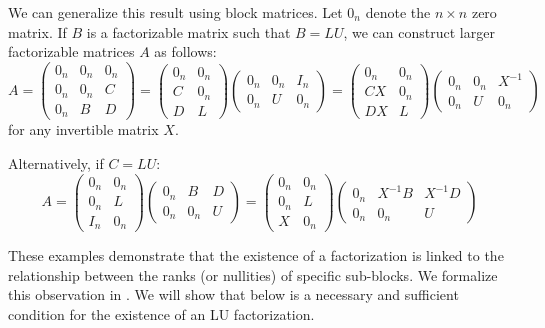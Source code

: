\documentclass[10pt,twoside]{siamart1116}
\numberwithin{theorem}{section}
\begin{document}
We can generalize this result using block matrices. Let $0_n$ denote the $n \times n$ zero matrix. If $B$ is a factorizable matrix such that $B=LU$, we can construct larger factorizable matrices $A$ as follows:
\[
	A = \begin{pmatrix}
		0_n & 0_n & 0_n \\
		0_n & 0_n & C   \\
		0_n & B   & D
	\end{pmatrix}
	=
	\begin{pmatrix}
		0_n & 0_n \\
		C   & 0_n \\
		D   & L
	\end{pmatrix}
	\begin{pmatrix}
		0_n & 0_n & I_n \\
		0_n & U   & 0_n
	\end{pmatrix}
	=
	\begin{pmatrix}
		0_n & 0_n \\
		CX  & 0_n \\
		DX  & L
	\end{pmatrix}
	\begin{pmatrix}
		0_n & 0_n & X^{-1} \\
		0_n & U   & 0_n
	\end{pmatrix}
\]
for any invertible matrix $X$.

Alternatively, if $C = LU$:
\[
	A =
	\begin{pmatrix}
		0_n & 0_n \\
		0_n & L   \\
		I_n & 0_n
	\end{pmatrix}
	\begin{pmatrix}
		0_n & B   & D \\
		0_n & 0_n & U
	\end{pmatrix}
	=
	\begin{pmatrix}
		0_n & 0_n \\
		0_n & L   \\
		X   & 0_n
	\end{pmatrix}
	\begin{pmatrix}
		0_n & X^{-1} B & X^{-1} D \\
		0_n & 0_n      & U
	\end{pmatrix}
\]

These examples demonstrate that the existence of a factorization is linked to the relationship between the ranks (or nullities) of specific sub-blocks. We formalize this observation in . We will show that  below is a necessary and sufficient condition for the existence of an LU factorization.
\end{document}

